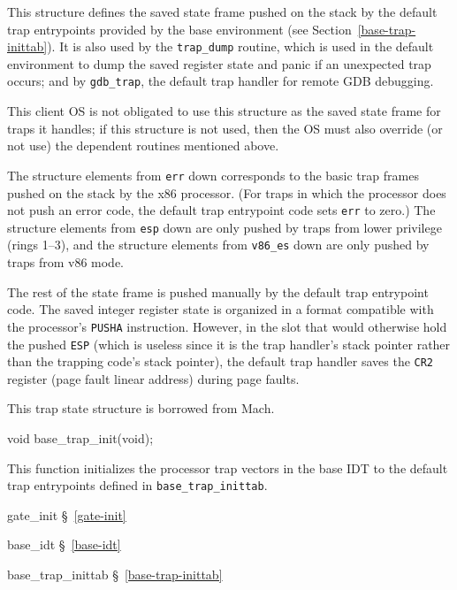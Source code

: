 \begin{apidesc}
	This structure defines the saved state frame
	pushed on the stack by the default trap entrypoints
	provided by the base environment
	(see Section~\ref{base-trap-inittab}).
	It is also used by the {\tt trap_dump} routine,
	which is used in the default environment
	to dump the saved register state and panic
	if an unexpected trap occurs;
	and by {\tt gdb_trap},
	the default trap handler for remote GDB debugging.

	This client OS is not obligated to use this structure
	as the saved state frame for traps it handles;
	if this structure is not used,
	then the OS must also override (or not use)
	the dependent routines mentioned above.

	The structure elements from {\tt err} down
	corresponds to the basic trap frames
	pushed on the stack by the x86 processor.
	(For traps in which the processor does not push an error code,
	the default trap entrypoint code sets {\tt err} to zero.)
	The structure elements from {\tt esp} down
	are only pushed by traps from lower privilege (rings 1--3),
	and the structure elements from {\tt v86_es} down
	are only pushed by traps from v86 mode.

	The rest of the state frame is pushed manually
	by the default trap entrypoint code.
	The saved integer register state is organized
	in a format compatible with the processor's {\tt PUSHA} instruction.
	However, in the slot that would otherwise hold the pushed {\tt ESP}
	(which is useless since it is the trap handler's stack pointer
	rather than the trapping code's stack pointer),
	the default trap handler saves the {\tt CR2} register
	(page fault linear address) during page faults.

	This trap state structure is borrowed from Mach.
\end{apidesc}

\label{base-trap-init}
\begin{apisyn}

	\funcproto void base_trap_init(void);
\end{apisyn}
\begin{apidesc}
	This function initializes the processor trap vectors in the base IDT
	to the default trap entrypoints defined in {\tt base_trap_inittab}.
\end{apidesc}
\begin{apidep}
	\item[gate_init]		\S~\ref{gate-init}
	\item[base_idt]			\S~\ref{base-idt}
	\item[base_trap_inittab]	\S~\ref{base-trap-inittab}
\end{apidep}


